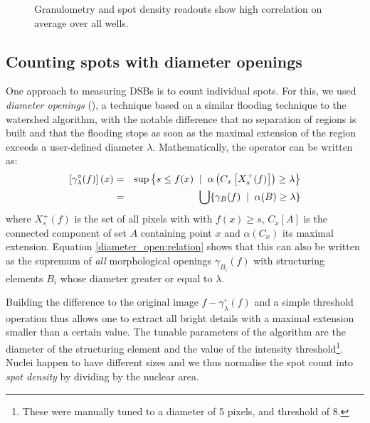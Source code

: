 \begin{figure}[ht]
\centering
{}
\caption{Granulometry and spot density readouts show high correlation on average over all wells.}
\label{fig:corr}
\end{figure}

\subsection{Counting spots with diameter openings}

One approach to measuring DSBs is to count individual spots. For this, we used \emph{diameter openings} (\cite{Walter2007}), a technique based on a similar flooding technique to the watershed algorithm, with the notable difference that no separation of regions is built and that the flooding stops as soon as the maximal extension of the region exceeds a user-defined diameter $\lambda$. Mathematically, the operator can be written as:
\begin{eqnarray} 
  \left[ \gamma^{\circ}_{\lambda}(f) \right] (x) 
    &=& \sup \left\{ s \leq f(x)
        \;\; | \;\;  \alpha \left( C_x \left[ X_s^+(f) \right] \right) \geq
        \lambda \right\} \nonumber \\ 
    &=& \bigcup \{ \gamma_B(f) \;\; | \;\; \alpha(B) \geq \lambda \} \label{diameter_open:relation}
\end{eqnarray}
where $X_s^+(f)$ is the set of all pixels with with $f(x)\geq s$, $C_x[A]$ is the connected component of set $A$ containing point $x$ and $\alpha(C_x)$ its maximal extension. Equation \ref{diameter_open:relation} shows that this can also be written as the supremum of \emph{all} morphological openings $\gamma_{B_i}(f)$ with structuring elements $B_i$ whose diameter greater or equal to $\lambda$. 

Building the difference to the original image $f-\gamma^{\circ}_{\lambda}(f)$ and a simple threshold operation thus allows one to extract all bright details with a maximal extension smaller than a certain value. The tunable parameters of the algorithm are the diameter of the structuring element and the value of the intensity threshold\footnote{These were manually tuned to a diameter of 5 pixels, and threshold of 8.}. Nuclei happen to have different sizes and we thus normalise the spot count into \emph{spot density} by dividing by the nuclear area.

